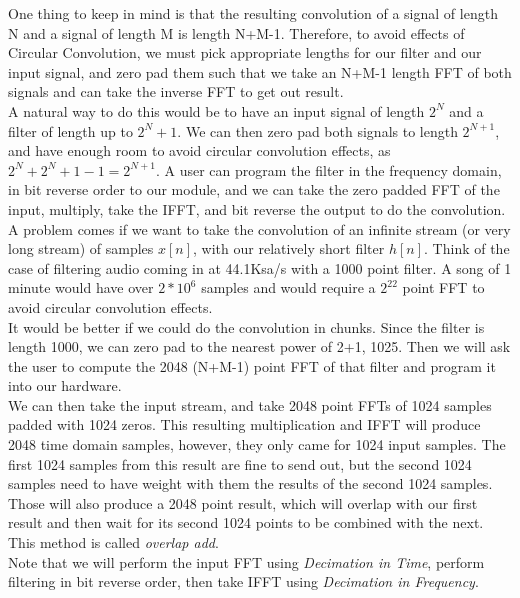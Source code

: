 \documentclass{article}
\begin{document}
One thing to keep in mind is that the resulting convolution of a signal of length N and a signal of length M is length N+M-1.
Therefore, to avoid effects of Circular Convolution, we must pick appropriate lengths for our filter and our input signal, and zero pad them
such that we take an N+M-1 length FFT of both signals and can take the inverse FFT to get out result. \\

A natural way to do this would be to have an input signal of length $2^{N}$ and a filter of length up to $2^{N}+1$.
We can then zero pad both signals to length $2^{N+1}$, and have enough room to avoid circular convolution effects,
as $2^{N} + 2^{N}+1 -1 = 2^{N+1}$. A user can program the filter in the frequency domain, in bit reverse order to our module, and we can take
the zero padded FFT of the input, multiply, take the IFFT, and bit reverse the output to do the convolution. \\

A problem comes if we want to take the convolution of an infinite stream (or very long stream) of samples $x\left[n\right]$, with our relatively short
filter $h\left[n\right]$. Think of the case of filtering audio coming in at 44.1Ksa/s with a 1000 point filter. A song of 1 minute would have over $2*10^{6}$
samples and would require a $2^{22}$ point FFT to avoid circular convolution effects. \\

It would be better if we could do the convolution in chunks. Since the filter is length 1000, we can zero pad to the nearest power of 2+1, 1025. Then we will ask
the user to compute the 2048 (N+M-1) point FFT of that filter and program it into our hardware. \\

We can then take the input stream, and take 2048 point FFTs of 1024 samples padded with 1024 zeros.
This resulting multiplication and IFFT will produce 2048 time domain samples, however, they only came for 1024 input samples.
The first 1024 samples from this result are fine to send out, but the second 1024 samples need to have weight with them the results of the second 1024 samples.
Those will also produce a 2048 point result, which will overlap with our first result and then wait for its second 1024 points to be combined with the next. \\

This method is called \emph{overlap add}. \\

Note that we will perform the input FFT using \emph{Decimation in Time}, perform filtering in bit reverse order, then take IFFT using
\emph{Decimation in Frequency}.
\end{document}
